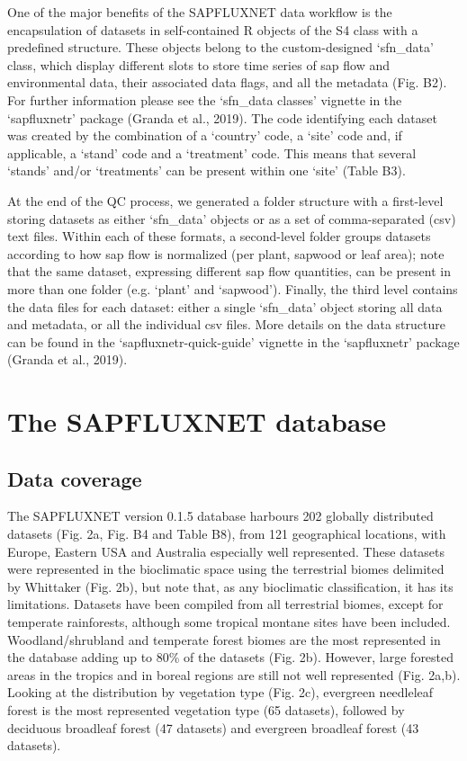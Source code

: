 \documentclass[11pt,twoside]{reedthesis}
\begin{document}
One of the major benefits of the SAPFLUXNET data workflow is the
encapsulation of datasets in self-contained R objects of the S4 class
with a predefined structure. These objects belong to the custom-designed
`sfn\_data' class, which display different slots to store time series of
sap flow and environmental data, their associated data flags, and all
the metadata (Fig. B2). For further information please see the
`sfn\_data classes' vignette in the `sapfluxnetr' package (Granda et
al., 2019). The code identifying each dataset was created by the
combination of a `country' code, a `site' code and, if applicable, a
`stand' code and a `treatment' code. This means that several `stands'
and/or `treatments' can be present within one `site' (Table B3).\par

At the end of the QC process, we generated a folder structure with a
first-level storing datasets as either `sfn\_data' objects or as a set
of comma-separated (csv) text files. Within each of these formats, a
second-level folder groups datasets according to how sap flow is
normalized (per plant, sapwood or leaf area); note that the same
dataset, expressing different sap flow quantities, can be present in
more than one folder (e.g. `plant' and `sapwood'). Finally, the third
level contains the data files for each dataset: either a single
`sfn\_data' object storing all data and metadata, or all the individual
csv files. More details on the data structure can be found in the
`sapfluxnetr-quick-guide' vignette in the `sapfluxnetr' package (Granda
et al., 2019).\par

\section{The SAPFLUXNET database}\label{the-sapfluxnet-database}

\subsection{Data coverage}\label{data-coverage}

The SAPFLUXNET version 0.1.5 database harbours 202 globally distributed
datasets (Fig. 2a, Fig. B4 and Table B8), from 121 geographical
locations, with Europe, Eastern USA and Australia especially well
represented. These datasets were represented in the bioclimatic space
using the terrestrial biomes delimited by Whittaker (Fig. 2b), but note
that, as any bioclimatic classification, it has its limitations.
Datasets have been compiled from all terrestrial biomes, except for
temperate rainforests, although some tropical montane sites have been
included. Woodland/shrubland and temperate forest biomes are the most
represented in the database adding up to 80\% of the datasets (Fig. 2b).
However, large forested areas in the tropics and in boreal regions are
still not well represented (Fig. 2a,b). Looking at the distribution by
vegetation type (Fig. 2c), evergreen needleleaf forest is the most
represented vegetation type (65 datasets), followed by deciduous
broadleaf forest (47 datasets) and evergreen broadleaf forest (43
datasets).\par
\end{document}
